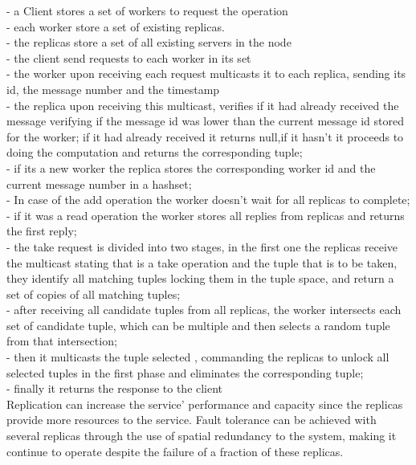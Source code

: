 \documentclass[times, 10pt,two column]{article}
\begin{document}
 - a Client stores a set of workers to request the operation\\
 - each worker store a set of existing replicas.\\
 - the replicas store a set of all existing servers in the node\\
 - the client send requests to each worker in its set\\
 - the worker upon receiving each request multicasts it to each replica, sending its id, the message number and the timestamp\\
 - the replica upon receiving this multicast, verifies if it had already received the message verifying if the message id was lower than the current message id stored for the worker; if it had already received it returns null,if it hasn't it proceeds to doing the computation and returns the corresponding tuple;\\
 - if its a new worker the replica stores the corresponding worker id and the current message number in a hashset;\\
 - In case of the add operation the worker doesn't wait for all replicas to complete;\\
 - if it was a read operation the worker stores all replies from replicas and returns the first reply;\\
 - the take request is divided into two stages, in the first one the replicas receive the multicast stating that is a take operation and the tuple that is to be taken, they identify all matching tuples locking them in the tuple space, and return a set of copies of all matching tuples;\\
 - after receiving all candidate tuples from all replicas, the worker intersects each set of candidate tuple, which can be multiple and then selects a random tuple from that intersection;\\
 - then it multicasts the tuple selected , commanding the replicas to unlock all selected tuples in the first phase and eliminates the corresponding tuple;\\
 - finally it returns the response to the client\\
 
Replication can increase the service’ performance and capacity since the replicas provide more resources to the service. 
Fault tolerance can be achieved with several replicas through the use of spatial redundancy to the system, making it continue to operate despite the failure of a fraction of these replicas.

 
 
\end{document}
